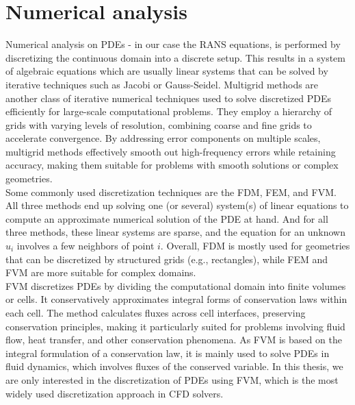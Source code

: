 \section{Numerical analysis}
Numerical analysis on PDEs - in our case the RANS equations, is performed by discretizing the continuous domain into a discrete setup. This results in a system of algebraic equations which are usually linear systems that can be solved by iterative techniques such as Jacobi or Gauss-Seidel. Multigrid methods are another class of iterative numerical techniques used to solve discretized PDEs efficiently for large-scale computational problems. They employ a hierarchy of grids with varying levels of resolution, combining coarse and fine grids to accelerate convergence. By addressing error components on multiple scales, multigrid methods effectively smooth out high-frequency errors while retaining accuracy, making them suitable for problems with smooth solutions or complex geometries. \\
Some commonly used discretization techniques are the \gls{FDM}, \gls{FEM}, and \gls{FVM}. All three methods end up solving one (or several) system(s) of linear equations to compute an approximate numerical solution of the PDE at hand. And for all three methods, these linear systems are sparse, and the equation for an unknown $u_i$ involves a few neighbors of point $i$. Overall, FDM is mostly used for geometries that can be discretized by structured grids (e.g., rectangles), while FEM and FVM are more suitable for complex domains. \\
FVM discretizes PDEs by dividing the computational domain into finite volumes or cells. It conservatively approximates integral forms of conservation laws within each cell. The method calculates fluxes across cell interfaces, preserving conservation principles, making it particularly suited for problems involving fluid flow, heat transfer, and other conservation phenomena. As FVM is based on the integral formulation of a conservation law, it is mainly used to solve PDEs in fluid dynamics, which involves fluxes of the conserved variable. In this thesis, we are only interested in the discretization of PDEs using FVM, which is the most widely used discretization approach in CFD solvers. 
